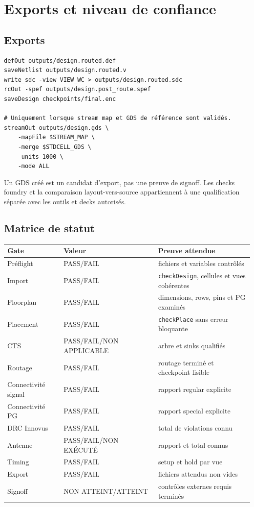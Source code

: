 \documentclass[11pt,a4paper,openany]{report}
\begin{document}
\chapter{Exports et niveau de confiance}

\section{Exports}

\begin{lstlisting}[style=guidecode,language=TclGuide]
defOut outputs/design.routed.def
saveNetlist outputs/design.routed.v
write_sdc -view VIEW_WC > outputs/design.routed.sdc
rcOut -spef outputs/design.post_route.spef
saveDesign checkpoints/final.enc

# Uniquement lorsque stream map et GDS de référence sont validés.
streamOut outputs/design.gds \
    -mapFile $STREAM_MAP \
    -merge $STDCELL_GDS \
    -units 1000 \
    -mode ALL
\end{lstlisting}

Un GDS créé est un candidat d'export, pas une preuve de signoff. Les checks
foundry et la comparaison layout-vers-source appartiennent à une qualification
séparée avec les outils et decks autorisés.

\section{Matrice de statut}

\begin{longtable}{p{0.26\textwidth}p{}p{}}
\toprule
Gate & Valeur & Preuve attendue \\
\midrule
Préflight & PASS/FAIL & fichiers et variables contrôlés \\
Import & PASS/FAIL & \texttt{checkDesign}, cellules et vues cohérentes \\
Floorplan & PASS/FAIL & dimensions, rows, pins et PG examinés \\
Placement & PASS/FAIL & \texttt{checkPlace} sans erreur bloquante \\
CTS & PASS/FAIL/NON APPLICABLE & arbre et sinks qualifiés \\
Routage & PASS/FAIL & routage terminé et checkpoint lisible \\
Connectivité signal & PASS/FAIL & rapport regular explicite \\
Connectivité PG & PASS/FAIL & rapport special explicite \\
DRC Innovus & PASS/FAIL & total de violations connu \\
Antenne & PASS/FAIL/NON EXÉCUTÉ & rapport et total connus \\
Timing & PASS/FAIL & setup et hold par vue \\
Export & PASS/FAIL & fichiers attendus non vides \\
Signoff & NON ATTEINT/ATTEINT & contrôles externes requis terminés \\
\bottomrule
\end{longtable}
\end{document}
